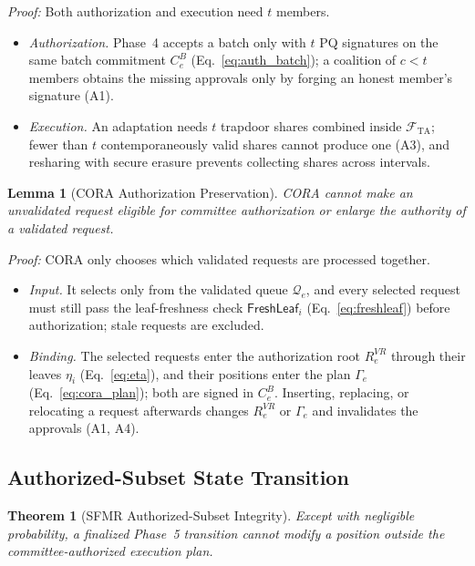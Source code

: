 \documentclass[lettersize,journal]{IEEEtran}
\newtheorem{theorem}{Theorem}
\newtheorem{lemma}{Lemma}
\begin{document}
\emph{Proof:} Both authorization and execution need $t$ members.
\begin{itemize}[leftmargin=*,nosep]
\item \emph{Authorization.} Phase~4 accepts a batch only with $t$ PQ
signatures on the same batch commitment $C_e^B$
(Eq.~\eqref{eq:auth_batch}); a coalition of $c<t$ members obtains the
missing approvals only by forging an honest member's signature (A1).
\item \emph{Execution.} An adaptation needs $t$ trapdoor shares combined
inside $\mathcal{F}_{\mathrm{TA}}$; fewer than $t$ contemporaneously
valid shares cannot produce one (A3), and resharing with secure erasure
prevents collecting shares across intervals.
\end{itemize}

\begin{lemma}[CORA Authorization Preservation]
CORA cannot make an unvalidated request eligible for committee
authorization or enlarge the authority of a validated request.
\end{lemma}

\emph{Proof:} CORA only chooses which validated requests are processed
together.
\begin{itemize}[leftmargin=*,nosep]
\item \emph{Input.} It selects only from the validated queue
$\mathcal{Q}_e$, and every selected request must still pass the
leaf-freshness check $\mathsf{FreshLeaf}_i$ (Eq.~\eqref{eq:freshleaf})
before authorization; stale requests are excluded.
\item \emph{Binding.} The selected requests enter the authorization root
$R_e^{VR}$ through their leaves $\eta_i$ (Eq.~\eqref{eq:eta}), and their
positions enter the plan $\Gamma_e$ (Eq.~\eqref{eq:cora_plan}); both are
signed in $C_e^B$. Inserting, replacing, or relocating a request
afterwards changes $R_e^{VR}$ or $\Gamma_e$ and invalidates the
approvals (A1, A4).
\end{itemize}

\subsection{Authorized-Subset State Transition}

\begin{theorem}[SFMR Authorized-Subset Integrity]
Except with negligible probability, a finalized Phase~5 transition
cannot modify a position outside the committee-authorized execution
plan.
\end{theorem}
\end{document}
